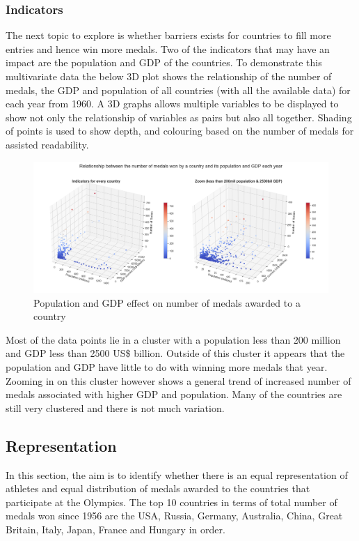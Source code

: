\documentclass[a4 paper, 12pt]{article}
\begin{document}
        \subsubsection{Indicators}
        The next topic to explore is whether barriers exists for countries to fill more entries and hence win more medals. Two of the indicators that may have an impact are the population and GDP of the countries. To demonstrate this multivariate data the below 3D plot shows the relationship of the number of medals, the GDP and population of all countries (with all the available data) for each year from 1960. A 3D graphs allows multiple variables to be displayed to show not only the relationship of variables as pairs but also all together. Shading of points is used to show depth, and colouring based on the number of medals for assisted readability.
        \begin{figure} [H]
            \centering
            \includegraphics[width=\textwidth, frame]
                {./images/graph/countries_pop_gdp_3d.png}      
                \caption{Population and GDP effect on number of medals awarded to a country} 
        \end{figure}

        Most of the data points lie in a cluster with a population less than 200 million and GDP less than 2500 US\$ billion. Outside of this cluster it appears that the population and GDP have little to do with winning more medals that year. Zooming in on this cluster however shows a general trend of increased number of medals associated with higher GDP and population. Many of the countries are still very clustered and there is not much variation. 

    \subsection{Representation}
    In this section, the aim is to identify whether there is an equal representation of athletes and equal distribution of medals awarded to the countries that participate at the Olympics. The top 10 countries in terms of total number of medals won since 1956 are the USA, Russia, Germany, Australia, China, Great Britain, Italy, Japan, France and Hungary in order. 
\end{document}
